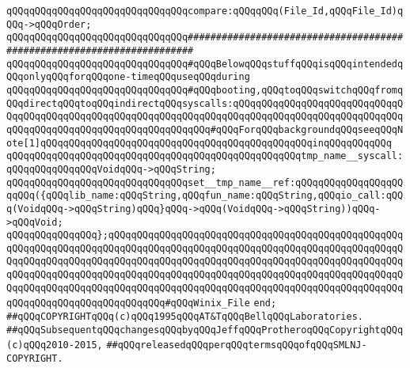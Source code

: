 \verb|qQQqqQQqqQQqqQQqqQQqqQQqqQQqqQQqcompare:qQQqqQQq(File_Id,qQQqFile_Id)qQQq->qQQqOrder;|\newline
\newline
\newline
\newline
\verb|qQQqqQQqqQQqqQQqqQQqqQQqqQQqqQQq#######################################################################|\newline
\verb|qQQqqQQqqQQqqQQqqQQqqQQqqQQqqQQq#qQQqBelowqQQqstuffqQQqisqQQqintendedqQQqonlyqQQqforqQQqone-timeqQQquseqQQqduring|\newline
\verb|qQQqqQQqqQQqqQQqqQQqqQQqqQQqqQQq#qQQqbooting,qQQqtoqQQqswitchqQQqfromqQQqdirectqQQqtoqQQqindirectqQQqsyscalls:qQQqqQQqqQQqqQQqqQQqqQQqqQQqqQQqqQQqqQQqqQQqqQQqqQQqqQQqqQQqqQQqqQQqqQQqqQQqqQQqqQQqqQQqqQQqqQQqqQQqqQQqqQQqqQQqqQQqqQQqqQQqqQQqqQQqqQQq#qQQqForqQQqbackgroundqQQqseeqQQqNote[1]qQQqqQQqqQQqqQQqqQQqqQQqqQQqqQQqqQQqqQQqqQQqqQQqinqQQqqQQqqQQq|\newline
\newline
\verb|qQQqqQQqqQQqqQQqqQQqqQQqqQQqqQQqqQQqqQQqqQQqqQQqqQQqtmp_name__syscall:qQQqqQQqqQQqqQQqVoidqQQq->qQQqString;|\newline
\verb|qQQqqQQqqQQqqQQqqQQqqQQqqQQqqQQqset__tmp_name__ref:qQQqqQQqqQQqqQQqqQQqqQQq({qQQqlib_name:qQQqString,qQQqfun_name:qQQqString,qQQqio_call:qQQq(VoidqQQq->qQQqString)qQQq}qQQq->qQQq(VoidqQQq->qQQqString))qQQq->qQQqVoid;|\newline
\newline
\verb|qQQqqQQqqQQqqQQq};qQQqqQQqqQQqqQQqqQQqqQQqqQQqqQQqqQQqqQQqqQQqqQQqqQQqqQQqqQQqqQQqqQQqqQQqqQQqqQQqqQQqqQQqqQQqqQQqqQQqqQQqqQQqqQQqqQQqqQQqqQQqqQQqqQQqqQQqqQQqqQQqqQQqqQQqqQQqqQQqqQQqqQQqqQQqqQQqqQQqqQQqqQQqqQQqqQQqqQQqqQQqqQQqqQQqqQQqqQQqqQQqqQQqqQQqqQQqqQQqqQQqqQQqqQQqqQQqqQQqqQQqqQQqqQQqqQQqqQQqqQQqqQQqqQQqqQQqqQQqqQQqqQQqqQQqqQQqqQQqqQQqqQQqqQQqqQQqqQQqqQQqqQQqqQQqqQQqqQQq#qQQqWinix_File|\newline
\verb|end;|\newline
\newline
\newline
\newline
\verb|##qQQqCOPYRIGHTqQQq(c)qQQq1995qQQqAT&TqQQqBellqQQqLaboratories.|\newline
\verb|##qQQqSubsequentqQQqchangesqQQqbyqQQqJeffqQQqProtheroqQQqCopyrightqQQq(c)qQQq2010-2015,|\newline
\verb|##qQQqreleasedqQQqperqQQqtermsqQQqofqQQqSMLNJ-COPYRIGHT.|\newline

